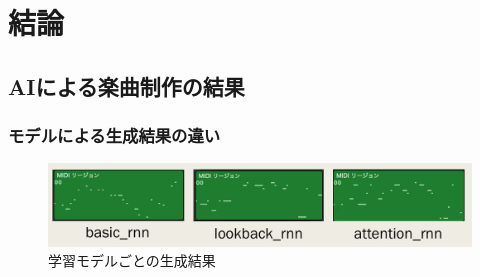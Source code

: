 \chapter{結論}
\section{AIによる楽曲制作の結果}
\subsection{モデルによる生成結果の違い}
\begin{figure}[h]
    \begin{screen}
    \begin{center}
        \includegraphics[scale=0.68, clip]{./img/model.png}
        \caption{学習モデルごとの生成結果}
        \label{fig:学習モデルごとの生成結果}
    \end{center}
    \end{screen}
\end{figure}
\newpage
